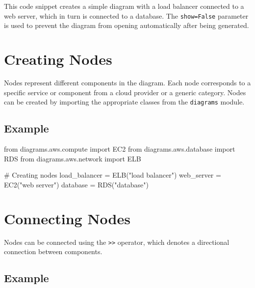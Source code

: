 \documentclass[
  letterpaper,
  DIV=11,
  numbers=noendperiod]{scrreprt}
\newenvironment{Shaded}{\begin{snugshade}}{\end{snugshade}}
\newcommand{\CommentTok}[1]{\textcolor[rgb]{0.37,0.37,0.37}{#1}}
\newcommand{\ImportTok}[1]{\textcolor[rgb]{0.00,0.46,0.62}{#1}}
\newcommand{\NormalTok}[1]{\textcolor[rgb]{0.00,0.23,0.31}{#1}}
\newcommand{\OperatorTok}[1]{\textcolor[rgb]{0.37,0.37,0.37}{#1}}
\newcommand{\StringTok}[1]{\textcolor[rgb]{0.13,0.47,0.30}{#1}}
\begin{document}
This code snippet creates a simple diagram with a load balancer
connected to a web server, which in turn is connected to a database. The
\texttt{show=False} parameter is used to prevent the diagram from
opening automatically after being generated.

\section{Creating Nodes}\label{creating-nodes}

Nodes represent different components in the diagram. Each node
corresponds to a specific service or component from a cloud provider or
a generic category. Nodes can be created by importing the appropriate
classes from the \texttt{diagrams} module.

\subsection{Example}\label{example-36}

\begin{Shaded}
\begin{Highlighting}[]
\ImportTok{from}\NormalTok{ diagrams.aws.compute }\ImportTok{import}\NormalTok{ EC2}
\ImportTok{from}\NormalTok{ diagrams.aws.database }\ImportTok{import}\NormalTok{ RDS}
\ImportTok{from}\NormalTok{ diagrams.aws.network }\ImportTok{import}\NormalTok{ ELB}

\CommentTok{\# Creating nodes}
\NormalTok{load\_balancer }\OperatorTok{=}\NormalTok{ ELB(}\StringTok{"load balancer"}\NormalTok{)}
\NormalTok{web\_server }\OperatorTok{=}\NormalTok{ EC2(}\StringTok{"web server"}\NormalTok{)}
\NormalTok{database }\OperatorTok{=}\NormalTok{ RDS(}\StringTok{"database"}\NormalTok{)}
\end{Highlighting}
\end{Shaded}

\section{Connecting Nodes}\label{connecting-nodes}

Nodes can be connected using the \texttt{\textgreater{}\textgreater{}}
operator, which denotes a directional connection between components.

\subsection{Example}\label{example-37}
\end{document}
